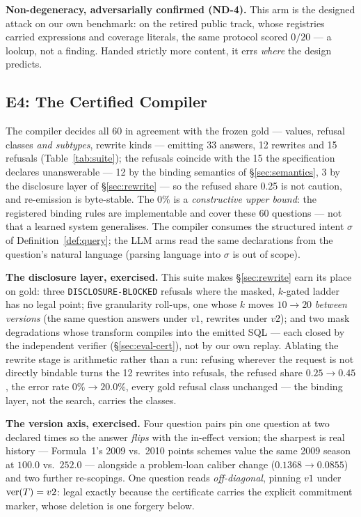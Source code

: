 \smallskip\noindent{}\textbf{Non-degeneracy, adversarially confirmed
(ND-4).} This arm is the designed attack on our own benchmark: on the
retired public track, whose registries carried expressions and coverage
literals, the same protocol scored $0/20$ --- a lookup, not a finding. Handed strictly
more content, it errs \emph{where} the design predicts.

\subsection{E4: The Certified Compiler}
\label{sec:eval-mech}

 The compiler decides all 60 in agreement with the frozen gold --- values,
refusal classes \emph{and subtypes}, rewrite kinds --- emitting 33
answers, 12 rewrites and 15 refusals (Table~\ref{tab:suite}); the refusals
coincide with the 15 the specification declares unanswerable --- 12 by the
binding semantics of \S\ref{sec:semantics}, 3 by the disclosure layer of
\S\ref{sec:rewrite} --- so the refused
share 0.25 is not caution, and re-emission is byte-stable. The
$0\%$ is a \emph{constructive upper bound}: the registered binding rules are
implementable and cover these 60 questions --- not that a learned system
generalises. The compiler consumes the structured intent $\sigma$ of
Definition~\ref{def:query}; the LLM arms read the same declarations from the
question's natural language (parsing language into $\sigma$ is out of
scope).

\smallskip\noindent{}\textbf{The disclosure layer, exercised.} This suite makes \S\ref{sec:rewrite} earn its place on gold: three
\texttt{DISCLOSURE-BLOCKED} refusals where the masked, $k$-gated ladder has
no legal point; five
granularity roll-ups, one whose $k$ moves $10\to20$ \emph{between versions}
(the same
question answers under $v1$, rewrites under $v2$); and two mask degradations
whose transform compiles into the emitted SQL --- each closed by the
independent verifier (\S\ref{sec:eval-cert}), not by our own replay. Ablating the rewrite stage
is arithmetic rather than a run: refusing wherever the request is not
directly bindable turns the 12 rewrites into refusals, the refused share
$0.25\to0.45$, the error rate $0\%\to20.0\%$, every gold refusal
class unchanged --- the binding layer, not the search, carries the classes.

\smallskip\noindent{}\textbf{The version axis, exercised.} Four question
pairs pin one question at two declared times so the answer \emph{flips}
with the in-effect version; the sharpest is real history ---
Formula~1's 2009 vs.\ 2010 points schemes value the same 2009 season at
$100.0$ vs.\ $252.0$ --- alongside a problem-loan caliber change
($0.1368\to0.0855$) and two further re-scopings.
One question reads \emph{off-diagonal}, pinning $v1$ under
$\mathrm{ver}(T)=v2$: legal exactly because the certificate carries the explicit
commitment marker, whose deletion is one forgery below.

